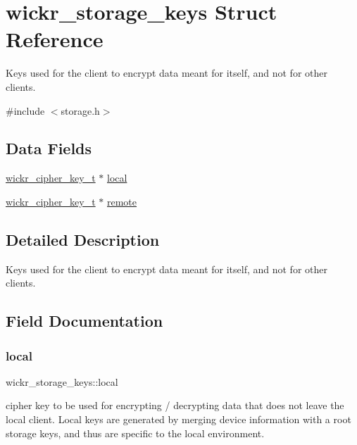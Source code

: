\hypertarget{structwickr__storage__keys}{}\section{wickr\+\_\+storage\+\_\+keys Struct Reference}
\label{structwickr__storage__keys}


Key\textquotesingle{}s used for the client to encrypt data meant for itself, and not for other clients.  




{\ttfamily \#include $<$storage.\+h$>$}

\subsection*{Data Fields}
\begin{DoxyCompactItemize}
\item 
\mbox{\hyperlink{structwickr__cipher__key}{wickr\+\_\+cipher\+\_\+key\+\_\+t}} $\ast$ \mbox{\hyperlink{structwickr__storage__keys_a544b35d7a75bd6076f6c34537e49ef6b}{local}}
\item 
\mbox{\hyperlink{structwickr__cipher__key}{wickr\+\_\+cipher\+\_\+key\+\_\+t}} $\ast$ \mbox{\hyperlink{structwickr__storage__keys_a44b6a0b14bcc877cb6799265b060cb28}{remote}}
\end{DoxyCompactItemize}


\subsection{Detailed Description}
Key\textquotesingle{}s used for the client to encrypt data meant for itself, and not for other clients. 

\subsection{Field Documentation}
\mbox{\label{structwickr__storage__keys_a544b35d7a75bd6076f6c34537e49ef6b}} 
\subsubsection{\texorpdfstring{local}{local}}
{\footnotesize\ttfamily wickr\+\_\+storage\+\_\+keys\+::local}

cipher key to be used for encrypting / decrypting data that does not leave the local client. Local keys are generated by merging device information with a root storage keys, and thus are specific to the local environment. \mbox{\label{structwickr__storage__keys_a44b6a0b14bcc877cb6799265b060cb28}} 
